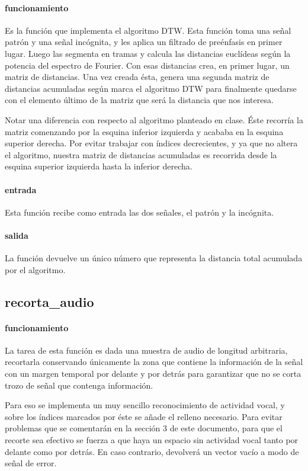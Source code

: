 \documentclass[10pt, a4paper]{article}
\begin{document}
\paragraph{funcionamiento} Es la función que implementa el algoritmo DTW. Esta función toma una señal patrón y una señal incógnita, y les aplica un filtrado de preénfasis en primer lugar. Luego las segmenta en tramas y calcula las distancias euclídeas según la potencia del espectro de Fourier. Con esas distancias crea, en primer lugar, un matriz de distancias. Una vez creada ésta, genera una segunda matriz de distancias acumuladas según marca el algoritmo DTW para finalmente quedarse con el elemento último de la matriz que será la distancia que nos interesa.

Notar una diferencia con respecto al algoritmo planteado en clase. Éste recorría la matriz comenzando por la esquina inferior izquierda y acababa en la esquina superior derecha. Por evitar trabajar con índices decrecientes, y ya que no altera el algoritmo, nuestra matriz de distancias acumuladas es recorrida desde la esquina superior izquierda hasta la inferior derecha.

\paragraph{entrada} Esta función recibe como entrada las dos señales, el patrón y la incógnita.

\paragraph{salida} La función devuelve un único número que representa la distancia total acumulada por el algoritmo.



\subsection*{recorta\_audio}

\paragraph{funcionamiento} La tarea de esta función es dada una muestra de audio de longitud arbitraria, recortarla conservando únicamente la zona que contiene la información de la señal con un margen temporal por delante y por detrás para garantizar que no se corta trozo de señal que contenga información.

Para eso se implementa un muy sencillo reconocimiento de actividad vocal, y sobre los índices marcados por éste se añade el relleno necesario. Para evitar problemas que se comentarán en la sección 3 de este documento, para que el recorte sea efectivo se fuerza a que haya un espacio sin actividad vocal tanto por delante como por detrás. En caso contrario, devolverá un vector vacío a modo de señal de error.
\end{document}
